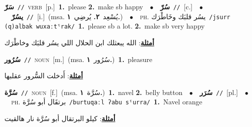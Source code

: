 \documentclass[10pt,a4paper,twoside]{article} %
\begin{document}
\begin{multicols}{2}
{\setlength\topsep{0pt}\textbf{\foreignlanguage{arabic}{سَرّ}}\ {\color{gray}\texttt{//}\color{black}}\ \textsc{verb}\ [p.]\ \textbf{1.}~please  \textbf{2.}~make sb happy\ \ $\bullet$\ \ \setlength\topsep{0pt}\textbf{\foreignlanguage{arabic}{سُرّ}}\ {\color{gray}\texttt{//}\color{black}}\ [c.]\ \ $\bullet$\ \ \setlength\topsep{0pt}\textbf{\foreignlanguage{arabic}{يسُرّ}}\ {\color{gray}\texttt{//}\color{black}}\ [i.]\ \color{gray}(msa. \foreignlanguage{arabic}{يُسْعِد}~\foreignlanguage{arabic}{\textbf{٢.}}  \foreignlanguage{arabic}{يُرضِي}~\foreignlanguage{arabic}{\textbf{١.}})\color{black}\ \ $\bullet$\ \ \textsc{ph.} \color{gray} \foreignlanguage{arabic}{يسُر قلبَك وخَاطْرَك}\color{black}\ {\color{gray}\texttt{/{\sffamily jsurr (q)albak wuxaːtˤrak}/}\color{black}}\ \textbf{1.}~please sb a lot.  \textbf{2.}~make sb very happy\  \begin{flushright}\color{gray}\foreignlanguage{arabic}{\textbf{\underline{\foreignlanguage{arabic}{أمثلة}}}: الله يبعثلك ابن الحلال اللي يسُر قلبَك وخاطْرَك}\end{flushright}\color{black}} \vspace{2mm}

{\setlength\topsep{0pt}\textbf{\foreignlanguage{arabic}{سُرُور}}\ {\color{gray}\texttt{//}\color{black}}\ \textsc{noun}\ [m.]\ \color{gray}(msa. \foreignlanguage{arabic}{سُرُور}~\foreignlanguage{arabic}{\textbf{١.}})\color{black}\ \textbf{1.}~pleasure\  \begin{flushright}\color{gray}\foreignlanguage{arabic}{\textbf{\underline{\foreignlanguage{arabic}{أمثلة}}}: أَدخلت السُّرور عقلبها}\end{flushright}\color{black}} \vspace{2mm}

{\setlength\topsep{0pt}\textbf{\foreignlanguage{arabic}{سُرَّة}}\ {\color{gray}\texttt{//}\color{black}}\ \textsc{noun}\ [f.]\ \color{gray}(msa. \foreignlanguage{arabic}{سُرَّة}~\foreignlanguage{arabic}{\textbf{١.}})\color{black}\ \textbf{1.}~navel  \textbf{2.}~belly button\ \ $\bullet$\ \ \setlength\topsep{0pt}\textbf{\foreignlanguage{arabic}{سُرَر}}\ {\color{gray}\texttt{//}\color{black}}\ [pl.]\ \ $\bullet$\ \ \textsc{ph.} \color{gray} \foreignlanguage{arabic}{برتقَال أبو سُرَّة}\color{black}\ {\color{gray}\texttt{/{\sffamily burtuqaːl ʔabu sˤurra}/}\color{black}}\ \textbf{1.}~Navel orange\  \begin{flushright}\color{gray}\foreignlanguage{arabic}{\textbf{\underline{\foreignlanguage{arabic}{أمثلة}}}: كيلو البرتقال أبو سُرَّة نار هالقيت}\end{flushright}\color{black}} \vspace{2mm}


\end{multicols}
\end{document}
